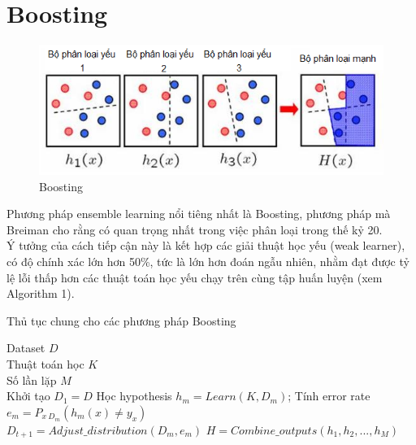 \section{Boosting}

\begin{figure}[H]
    \centering
    \includegraphics{Chapter2/Figs/weak-learner.PNG}
    \caption{Boosting}
    \label{fig:my_label}
\end{figure}
Phương pháp ensemble learning nổi tiêng nhất là Boosting, phương pháp mà Breiman \cite{16} cho rằng có quan trọng nhất trong việc phân loại trong thế kỷ 20. \\
\indent Ý tưởng của cách tiếp cận này là kết hợp các giải thuật học yếu (weak learner), có độ chính xác lớn hơn 50\%, tức là lớn hơn đoán ngẫu nhiên, nhằm đạt được tỷ lệ lỗi thấp hơn các thuật toán học yếu chạy trên cùng tập huấn luyện (xem Algorithm 1). 

\begin{algorithm}
 \caption{Thủ tục chung cho các phương pháp Boosting}
 \label{algo_1}
 \begin{algorithmic}[1]
 \renewcommand{\algorithmicrequire}{\textbf{Input:}}
 \renewcommand{\algorithmicensure}{\textbf{Output:}}
\REQUIRE Dataset $D$\\
        Thuật toán học $K$\\
        Số lần lặp $M$ \\
        
\STATE Khởi tạo $D_1 = D$ 
    \STATE Học hypothesis $h_m = Learn(K, D_m)$;
    \STATE Tính error rate $e_m = P_{x ~ D_m}(h_m(x) \neq y_x)$\\
    $D_{t+1} = Adjust\_distribution(D_m, e_m)$
\ENDFOR
\ENSURE $H = Combine\_outputs(h_1, h_2, ..., h_M)$
\end{algorithmic} 
\end{algorithm}

